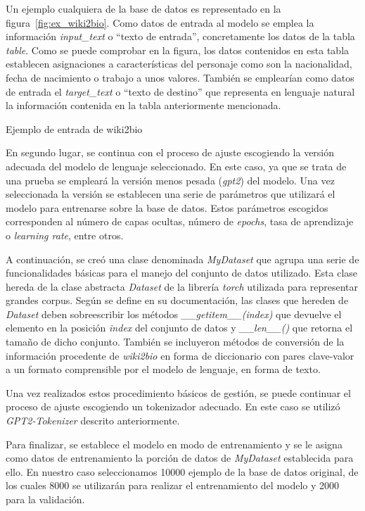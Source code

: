 Un ejemplo cualquiera de la base de datos es representado en la figura~\ref{fig:ex_wiki2bio}. Como datos de entrada al modelo se emplea la información \textit{input\_text} o ``texto de entrada'', concretamente los datos de la tabla \textit{table}. Como se puede comprobar en la figura, los datos contenidos en esta tabla establecen asignaciones a características del personaje como son la nacionalidad, fecha de nacimiento o trabajo a unos valores. También se emplearían como datos de entrada el \textit{target\_text} o ``texto de destino'' que representa en lenguaje natural la información contenida en la tabla anteriormente mencionada.


%
{Ejemplo de entrada de wiki2bio}


En segundo lugar, se continua con el proceso de ajuste escogiendo la versión adecuada del modelo de lenguaje seleccionado. En este caso, ya que se trata de una prueba se empleará la versión menos pesada (\textit{gpt2}) del modelo. Una vez seleccionada la versión se establecen una serie de parámetros que utilizará el modelo para entrenarse sobre la base de datos. Estos parámetros escogidos corresponden al número de capas ocultas, número de \textit{epochs}, tasa de aprendizaje o \textit{learning rate}, entre otros.


A continuación, se creó una clase denominada \textit{MyDataset} que agrupa una serie de funcionalidades básicas para el manejo del conjunto de datos utilizado. Esta clase hereda de la clase abstracta \textit{Dataset} de la librería \textit{torch} utilizada para representar grandes corpus. Según se define en su documentación, las clases que hereden de \textit{Dataset} deben sobreescribir los métodos \textit{\_\_getitem\_\_(index)} que devuelve el elemento en la posición \textit{index} del conjunto de datos y \textit{\_\_len\_\_()} que retorna el tamaño de dicho conjunto. También se incluyeron métodos de conversión de la información procedente de \textit{wiki2bio} en forma de diccionario con pares clave-valor a un formato comprensible por el modelo de lenguaje, en forma de texto.

Una vez realizados estos procedimiento básicos de gestión, se puede continuar el proceso de ajuste escogiendo un tokenizador adecuado. En este caso se utilizó \textit{GPT2-Tokenizer} descrito anteriormente.

Para finalizar, se establece el modelo en modo de entrenamiento y se le asigna como datos de entrenamiento la porción de datos de \textit{MyDataset} establecida para ello. En nuestro caso seleccionamos 10000 ejemplo de la base de datos original, de los cuales 8000 se utilizarán para realizar el entrenamiento del modelo y 2000 para la validación.

